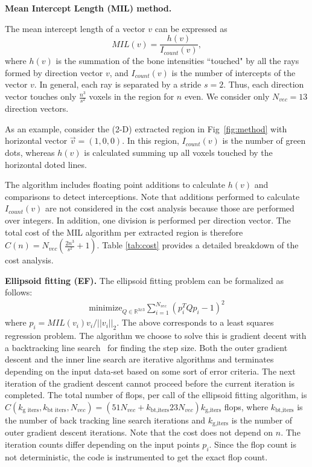 \documentclass[letterpaper]{article}
\newcommand{\mypar}[1]{{\bf #1.}}
\begin{document}
\mypar{Mean Intercept Length (MIL) method}

The mean intercept length of a vector ${v}$ can be expressed as
\begin{equation}
  MIL({v}) = \frac{h({v})}{I_{count}({v})},
\end{equation}
where $h(v)$ is the summation of the bone intensities ``touched" by all the rays formed by direction vector $v$, and $I_{count}(v)$ is the number of intercepts of the vector $v$.  In general, each ray is separated by a stride $s=2$. Thus, each direction vector touches only $\frac{n^3}{s^2}$ voxels in the region for $n$ even. We consider only $N_{vec}=13$ direction vectors.

As an example, consider the (2-D) extracted region in Fig~\ref{fig:method} with horizontal vector $\vec{v} = (1,0,0)$. In this region, $I_{count}(v)$ is the number of green dots, whereas $h({v})$ is calculated summing up all voxels touched by the horizontal doted lines.


The algorithm includes floating point additions to calculate $h({v})$ and comparisons to detect interceptions. Note that additions performed to calculate $I_{count}(v)$ are not considered in the cost analysis because those are performed over integers. In addition, one division is performed per direction vector. The total cost of the MIL algorithm per extracted region is therefore $C(n) = N_{vec}(\frac{2n^3}{s^2}+1)$. Table \ref{tab:cost} provides a detailed breakdown of the cost analysis.

\mypar{Ellipsoid fitting (EF)}  
The ellipsoid fitting problem can be formalized as follows:
\begin{align}
  \mathrm{minimize}_{Q\in\mathbb{R}^{3x3}} \sum_{i=1}^{N_{vec}} (p_i^T Q p_i - 1)^2
\end{align}
where $p_i = MIL(v_i) v_i/||v_i||_2$. The above corresponds to a least squares regression problem. The algorithm we choose to solve this is gradient decent with a backtracking line search~\cite{boyd2004convex} for finding the step size. Both the outer gradient descent and the inner line search are iterative algorithms and terminates depending on the input data-set based on some sort of error criteria. The next iteration of the gradient descent cannot proceed before the current iteration is completed. The total number of flops, per call of the ellipsoid fitting algorithm, is  $C(k_\text{g iters},k_\text{bt iters},N_{vec}) = (51N_{vec} + k_\text{bt,iters}23N_{vec})k_\text{g,iters}$ flops, where $k_\text{bt,iters}$ is the number of back tracking line search iterations and $k_\text{g,iters}$ is the number of outer gradient descent iterations. Note that the cost does not depend on $n$. The iteration counts differ depending on the input points $p_i$. Since the flop count is not deterministic, the code is instrumented to get the exact flop count. 
\end{document}
